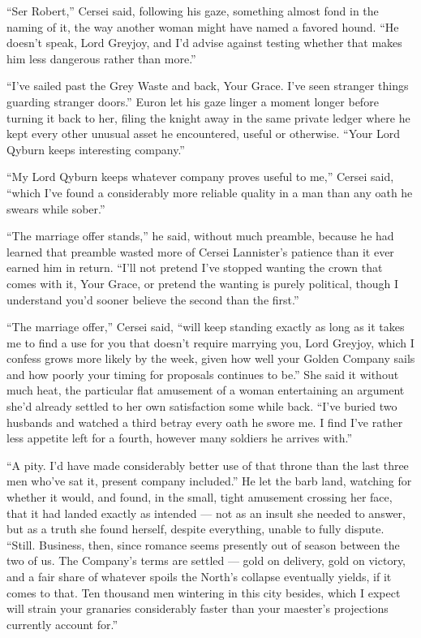 “Ser Robert,” Cersei said, following his gaze, something almost fond in the naming of it, the way another woman might have named a favored hound. “He doesn’t speak, Lord Greyjoy, and I’d advise against testing whether that makes him less dangerous rather than more.”

“I’ve sailed past the Grey Waste and back, Your Grace. I’ve seen stranger things guarding stranger doors.” Euron let his gaze linger a moment longer before turning it back to her, filing the knight away in the same private ledger where he kept every other unusual asset he encountered, useful or otherwise. “Your Lord Qyburn keeps interesting company.”

“My Lord Qyburn keeps whatever company proves useful to me,” Cersei said, “which I’ve found a considerably more reliable quality in a man than any oath he swears while sober.”

“The marriage offer stands,” he said, without much preamble, because he had learned that preamble wasted more of Cersei Lannister’s patience than it ever earned him in return. “I’ll not pretend I’ve stopped wanting the crown that comes with it, Your Grace, or pretend the wanting is purely political, though I understand you’d sooner believe the second than the first.”

“The marriage offer,” Cersei said, “will keep standing exactly as long as it takes me to find a use for you that doesn’t require marrying you, Lord Greyjoy, which I confess grows more likely by the week, given how well your Golden Company sails and how poorly your timing for proposals continues to be.” She said it without much heat, the particular flat amusement of a woman entertaining an argument she’d already settled to her own satisfaction some while back. “I’ve buried two husbands and watched a third betray every oath he swore me. I find I’ve rather less appetite left for a fourth, however many soldiers he arrives with.”

“A pity. I’d have made considerably better use of that throne than the last three men who’ve sat it, present company included.” He let the barb land, watching for whether it would, and found, in the small, tight amusement crossing her face, that it had landed exactly as intended — not as an insult she needed to answer, but as a truth she found herself, despite everything, unable to fully dispute. “Still. Business, then, since romance seems presently out of season between the two of us. The Company’s terms are settled — gold on delivery, gold on victory, and a fair share of whatever spoils the North’s collapse eventually yields, if it comes to that. Ten thousand men wintering in this city besides, which I expect will strain your granaries considerably faster than your maester’s projections currently account for.”

